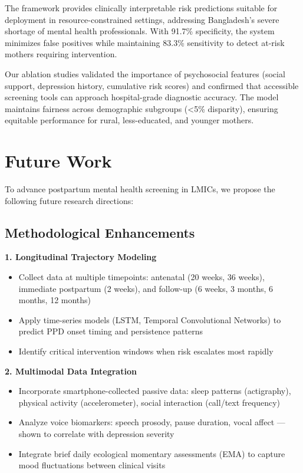 The framework provides clinically interpretable risk predictions suitable for deployment in resource-constrained settings, addressing Bangladesh's severe shortage of mental health professionals. With 91.7\% specificity, the system minimizes false positives while maintaining 83.3\% sensitivity to detect at-risk mothers requiring intervention.

Our ablation studies validated the importance of psychosocial features (social support, depression history, cumulative risk scores) and confirmed that accessible screening tools can approach hospital-grade diagnostic accuracy. The model maintains fairness across demographic subgroups (<5\% disparity), ensuring equitable performance for rural, less-educated, and younger mothers.

\section{Future Work}

To advance postpartum mental health screening in LMICs, we propose the following future research directions:

\subsection{Methodological Enhancements}

\textbf{1. Longitudinal Trajectory Modeling}
\begin{itemize}
    \item Collect data at multiple timepoints: antenatal (20 weeks, 36 weeks), immediate postpartum (2 weeks), and follow-up (6 weeks, 3 months, 6 months, 12 months)
    \item Apply time-series models (LSTM, Temporal Convolutional Networks) to predict PPD onset timing and persistence patterns
    \item Identify critical intervention windows when risk escalates most rapidly
\end{itemize}

\textbf{2. Multimodal Data Integration}
\begin{itemize}
    \item Incorporate smartphone-collected passive data: sleep patterns (actigraphy), physical activity (accelerometer), social interaction (call/text frequency)
    \item Analyze voice biomarkers: speech prosody, pause duration, vocal affect — shown to correlate with depression severity
    \item Integrate brief daily ecological momentary assessments (EMA) to capture mood fluctuations between clinical visits
\end{itemize}

